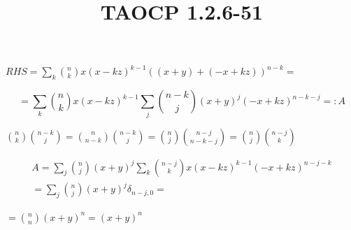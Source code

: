 \documentclass{article}
\title{TAOCP 1.2.6\mbox{-}51}
\begin{document}
\maketitle

\( RHS = \sum_{k} \binom{n}{k}x{(x-kz)}^{k-1}{((x+y) + (-x+kz))}^{n-k} = \)

\[ = \sum_{k} \binom{n}{k} x{(x-kz)}^{k-1} \sum_{j} \binom{n-k}{j}{(x+y)}^{j}{(-x+kz)}^{n-k-j} =: A \]

\( \binom{n}{k}\binom{n-k}{j} = \binom{n}{n-k}\binom{n-k}{j} = \binom{n}{j}\binom{n-j}{n-k-j} = \binom{n}{j}\binom{n-j}{k} \)

\begin{multline*}
A = \sum_{j} \binom{n}{j}{(x+y)}^{j} \sum_{k} \binom{n-j}{k}x{(x-kz)}^{k-1}{(-x+kz)}^{n-j-k} \\
= \sum_{j} \binom{n}{j}{(x+y)}^{j} \delta_{n-j,0} =
\end{multline*}

\( = \binom{n}{n}{(x+y)}^{n} = {(x+y)}^{n} \)
\end{document}
